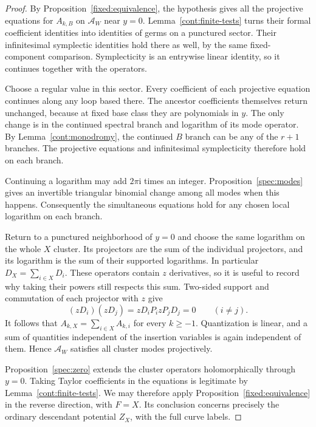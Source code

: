 \begin{proof}
By Proposition~\ref{fixed:equivalence}, the hypothesis gives all
the projective equations for $A_{k,B}$ on $\mathcal A_W$ near
$y=0$. Lemma~\ref{cont:finite-tests} turns their formal
coefficient identities into identities of germs on a
punctured sector. Their infinitesimal symplectic identities
hold there as well, by the same fixed-component comparison.
Symplecticity is an entrywise linear identity, so it
continues together with the operators.

Choose a regular value in this sector. Every coefficient of
each projective equation continues along any loop based
there. The ancestor coefficients themselves return unchanged,
because at fixed base class they are polynomials in $y$.
The only change is in the continued spectral branch and
logarithm of its mode operator. By
Lemma~\ref{cont:monodromy}, the continued $B$ branch can be
any of the $r+1$ branches. The projective equations and
infinitesimal symplecticity therefore hold on each branch.

Continuing a logarithm may add $2\pi\mathrm i$ times an
integer. Proposition~\ref{spec:modes} gives an invertible
triangular binomial change among all modes when this happens.
Consequently the simultaneous equations hold for any chosen
local logarithm on each branch.

Return to a punctured neighborhood of $y=0$ and choose the
same logarithm on the whole $X$ cluster. Its projectors are
the sum of the individual projectors, and its logarithm is
the sum of their supported logarithms. In particular
$D_X=\sum_{i\in X}D_i$. These operators contain $z$
derivatives, so it is useful to record why taking their
powers still respects this sum. Two-sided support and
commutation of each projector with $z$ give
\[
 (zD_i)(zD_j)=zD_iP_i zP_jD_j=0\qquad(i\neq j).
\]
It follows that $A_{k,X}=\sum_{i\in X}A_{k,i}$ for every
$k\geq-1$. Quantization is linear, and a sum of quantities
independent of the insertion variables is again independent
of them. Hence $\mathcal A_W$ satisfies all cluster modes
projectively.

Proposition~\ref{spec:zero} extends the cluster operators
holomorphically through $y=0$. Taking Taylor coefficients in
the equations is legitimate by
Lemma~\ref{cont:finite-tests}. We may therefore apply
Proposition~\ref{fixed:equivalence} in the reverse direction,
with $F=X$. Its conclusion concerns precisely the ordinary
descendant potential $Z_X$, with the full curve labels.
\end{proof}

